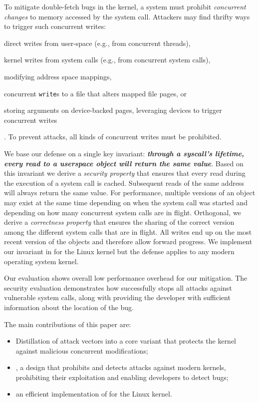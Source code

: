 \documentclass[letterpaper,twocolumn,10pt, anonymous]{article}
\begin{document}
To mitigate double-fetch bugs in the kernel, a system must prohibit
\emph{concurrent changes} to memory accessed by the system call. Attackers may
find thrifty ways to trigger such concurrent writes:
\begin{inparaenum}
\item  direct writes from user-space (e.g., from concurrent threads),
\item  kernel writes from system calls (e.g., from concurrent system calls),
\item  modifying address space mappings,
\item  concurrent \texttt{write}s to a file that alters mapped
file pages, or
\item  storing arguments on device-backed pages, leveraging devices to trigger
concurrent writes
\end{inparaenum}.
To prevent attacks, all kinds of concurrent writes must be prohibited.

We base our defense on a single key invariant: 
\textbf{\emph{through a syscall's lifetime, every read to a userspace object 
will return the same value}}. Based on this invariant we derive a \emph{security
property} that ensures that every read during the execution of a system call is
cached. Subsequent reads of the same address will always return the same value.
For performance, multiple versions of an object may exist at the same time
depending on when the system call was started and depending on how many
concurrent system calls are in flight. Orthogonal, we derive a \emph{correctness
property} that ensures the sharing of the correct version among the different
system calls that are in flight. All writes end up on the most recent version of
the objects and therefore allow forward progress.
We implement our invariant in \tiktok for the Linux kernel but the defense
applies to any modern operating system kernel.

Our evaluation shows overall low performance overhead for our mitigation.
The security evaluation demonstrates how \tiktok successfully stops all attacks
against vulnerable system calls, along with providing the developer with
sufficient information about the location of the bug.


The main contributions of this paper are:

\begin{itemize}
\item Distillation of \tocttou attack vectors into a core variant that protects
the kernel against malicious concurrent modifications;
\item \tiktok, a design that prohibits and detects
\tocttou attacks against modern kernels, prohibiting their exploitation and
enabling developers to detect \tocttou bugs;
\item an efficient implementation of \tiktok for the Linux kernel.
\end{itemize}
\end{document}
